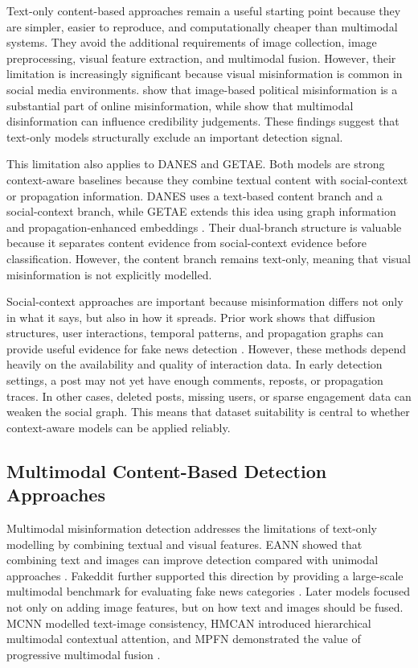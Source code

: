 Text-only content-based approaches remain a useful starting point because they are simpler, easier to reproduce, and computationally cheaper than multimodal systems. They avoid the additional requirements of image collection, image preprocessing, visual feature extraction, and multimodal fusion. However, their limitation is increasingly significant because visual misinformation is common in social media environments. \citet{yang2023facebook} show that image-based political misinformation is a substantial part of online misinformation, while \citet{hameleers2020} show that multimodal disinformation can influence credibility judgements. These findings suggest that text-only models structurally exclude an important detection signal.

This limitation also applies to DANES and GETAE. Both models are strong context-aware baselines because they combine textual content with social-context or propagation information. DANES uses a text-based content branch and a social-context branch, while GETAE extends this idea using graph information and propagation-enhanced embeddings \citep{truica2024danes,GETAE2025}. Their dual-branch structure is valuable because it separates content evidence from social-context evidence before classification. However, the content branch remains text-only, meaning that visual misinformation is not explicitly modelled.

Social-context approaches are important because misinformation differs not only in what it says, but also in how it spreads. Prior work shows that diffusion structures, user interactions, temporal patterns, and propagation graphs can provide useful evidence for fake news detection \citep{Vosoughi2018,Song2021,Min2022,Zhu24}. However, these methods depend heavily on the availability and quality of interaction data. In early detection settings, a post may not yet have enough comments, reposts, or propagation traces. In other cases, deleted posts, missing users, or sparse engagement data can weaken the social graph. This means that dataset suitability is central to whether context-aware models can be applied reliably.

\subsection{Multimodal Content-Based Detection Approaches}

Multimodal misinformation detection addresses the limitations of text-only modelling by combining textual and visual features. EANN showed that combining text and images can improve detection compared with unimodal approaches \citep{Wang2018}. Fakeddit further supported this direction by providing a large-scale multimodal benchmark for evaluating fake news categories \citep{Nakamura2020}. Later models focused not only on adding image features, but on how text and images should be fused. MCNN modelled text-image consistency, HMCAN introduced hierarchical multimodal contextual attention, and MPFN demonstrated the value of progressive multimodal fusion \citep{Xue2021,Qian2021,Jing2023}.


